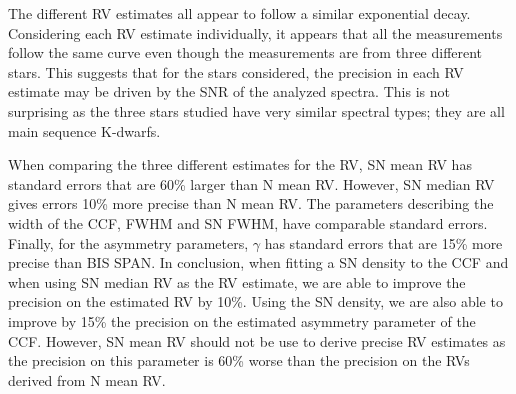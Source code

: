 \documentclass{aa}
\begin{document}
The different RV estimates all appear to follow a similar exponential decay. Considering each RV estimate individually, it appears that all the measurements follow the same curve even though the measurements are from three different stars. This suggests that for the stars considered, the precision in each RV estimate may be driven by the SNR of the analyzed spectra. 
This is not surprising as the three stars studied have very similar spectral types; they are all main sequence K-dwarfs. 

When comparing the three different estimates for the RV, SN mean RV has standard errors that are 60\% larger than N mean RV. However, SN median RV gives errors 10\% more precise than N mean RV. 
The parameters describing the width of the CCF, FWHM and SN FWHM, have comparable standard errors. 
Finally, for the asymmetry parameters, $\gamma$ has standard errors that are 15\% more precise than BIS SPAN. 
In conclusion, when fitting a SN density to the CCF and when using SN median RV as the RV estimate, we are able to improve the precision on the estimated RV by 10\%. Using the SN density, we are also able to improve by 15\% the precision on the estimated asymmetry parameter of the CCF.  However, SN mean RV should not be use to derive precise RV estimates
as the precision on this parameter is 60\% worse than the precision on the RVs derived from N mean RV.
%
\end{document}
